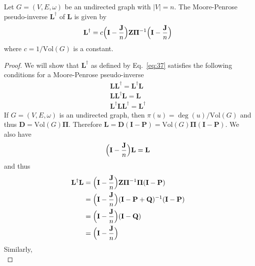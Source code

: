 \begin{proposition}
  \label{prop:11}
  Let $G = (V,E,\omega)$ be an undirected graph with $|V| = n$. The
  Moore-Penrose pseudo-inverse $\mathbf{L}^{\dagger}$ of $\mathbf{L}$ is given
  by
  \begin{equation}
    \label{eq:37}
    \mathbf{L}^{\dagger} = c \Bigl(\mathbf{I} - \frac{\mathbf{J}}{n}\Bigr) \mathbf{Z}
    \bm{\Pi}^{-1} \Bigl(\mathbf{I} - \frac{\mathbf{J}}{n}\Bigr)
  \end{equation}
  where $c = 1/\mathrm{Vol}(G)$ is a constant. 
\end{proposition}
\begin{proof}
  We will show that $\mathbf{L}^{\dagger}$ as defined by Eq.~\eqref{eq:37}
  satisfies the following conditions for a Moore-Penrose pseudo-inverse
  \begin{gather*}
    \mathbf{L}\mathbf{L}^{\dagger} = \mathbf{L}^{\dagger}\mathbf{L} \tag{(i)} \\
    \mathbf{L}\mathbf{L}^{\dagger}\mathbf{L} = \mathbf{L} \tag{(ii)} \\
    \mathbf{L}^{\dagger}\mathbf{L} \mathbf{L}^{\dagger} = \mathbf{L}^{\dagger}
    \tag{(iii)}
  \end{gather*}
  If $G = (V,E,\omega)$ is an undirected graph, then $\pi(u) =
  \deg(u)/\mathrm{Vol}(G)$ and thus $\mathbf{D} = \mathrm{Vol}(G)
  \bm{\Pi}$. Therefore $\mathbf{L} = \mathbf{D}(\mathbf{I} - \mathbf{P}) =
  \mathrm{Vol}(G) \bm{\Pi}(\mathbf{I} - \mathbf{P})$. We also have
  \begin{equation}
    \label{eq:38}
    \Bigl(\mathbf{I} - \frac{\mathbf{J}}{n}\Bigr)\mathbf{L} = \mathbf{L}
  \end{equation}
  and thus
  \begin{equation}
    \label{eq:39}
    \begin{split}
      \mathbf{L}^{\dagger}\mathbf{L} &= \Bigl(\mathbf{I} - \frac{\mathbf{J}}{n}\Bigr) \mathbf{Z}
       \bm{\Pi}^{-1} \bm{\Pi}(\mathbf{I} - \mathbf{P}) \\
       &= \Bigl(\mathbf{I} - \frac{\mathbf{J}}{n}\Bigr) (\mathbf{I} - \mathbf{P} + \mathbf{Q})^{-1}
       (\mathbf{I} - \mathbf{P}) \\
       &= \Bigl(\mathbf{I} - \frac{\mathbf{J}}{n}\Bigr)(\mathbf{I} - \mathbf{Q}) \\
       &= \Bigl(\mathbf{I} - \frac{\mathbf{J}}{n}\Bigr)
   \end{split}
  \end{equation}
  Similarly,
  \begin{equation}

\end{equation}
\end{proof}
